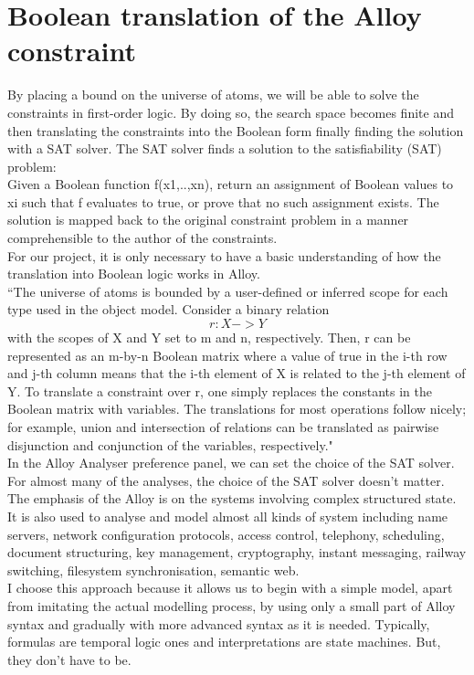 \documentclass[a4paper,12pt]{extarticle}
\begin{document}
\section{Boolean translation of the Alloy constraint}
\label{Bool Transl}
By placing a bound on the universe of atoms, we will be able to solve the constraints in first-order logic. By doing so, the search space becomes finite and then translating the constraints into the Boolean form finally finding the solution with a SAT solver. The SAT solver finds a solution to the satisfiability (SAT) problem: \\
Given a Boolean function f(x1,..,xn), return an assignment of Boolean values to xi such that f evaluates to true, or prove that no such assignment exists. The solution is mapped back to the original constraint problem in a manner comprehensible to the author of the constraints. \\
 For our project, it is only necessary to have a basic understanding of how the translation into Boolean logic works in Alloy. \\
``The universe of atoms is bounded by a user-defined or inferred scope for each type used in the object model. Consider a binary relation
\begin{equation}
r : X->Y
\end{equation} with the scopes of X and Y set to m and n, respectively. Then, r can be represented as an m-by-n Boolean matrix where a value of true in the i-th row and j-th column means that the i-th element of X is related to the j-th element of Y. To translate a constraint over r, one simply replaces the constants in the Boolean matrix with variables. The translations for most operations follow nicely; for example, union and intersection of relations can be translated as pairwise disjunction and conjunction of the variables, respectively." \\
In the Alloy Analyser preference panel, we can set the choice of the SAT solver. For almost many of the analyses, the choice of the SAT solver doesn't matter.
The emphasis of the Alloy is on the systems involving complex structured state. It is also used to analyse and model almost all kinds of system including name servers, network configuration protocols, access control, telephony, scheduling, document structuring, key management, cryptography, instant messaging, railway switching, filesystem synchronisation, semantic web. \\
I choose this approach because it allows us to begin with a simple model, apart from imitating the actual modelling process, by using only a small part of Alloy syntax and gradually with more advanced syntax as it is needed. Typically, formulas are temporal logic ones and interpretations are state machines. But, they don't have to be.
\end{document}
